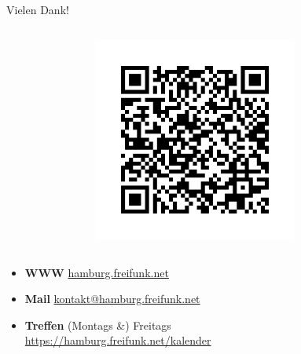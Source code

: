 \documentclass[t]{beamer}
\begin{document}
  \begin{frame}{Vielen Dank!}
    \begin{columns}
      \begin{column}{0.5\textwidth}
        \centering
        
      \end{column}
      
      \begin{column}{0.5\textwidth}
        \centering
        \includegraphics[width=0.65\textwidth]{Bilder/qrcode-2019-10-29}
      \end{column}
    \end{columns}   
    
    \begin{itemize}
      \item \textbf{WWW} \href{https://hamburg.freifunk.net}{hamburg.freifunk.net}
      \item \textbf{Mail} \href{mailto:kontakt@hamburg.freifunk.net}{kontakt@hamburg.freifunk.net}
      \item \textbf{Treffen} (Montags \&) Freitags\\\href{https://hamburg.freifunk.net/kalender}{\small https://hamburg.freifunk.net/kalender}
    \end{itemize}
  \end{frame}
  
\end{document}
